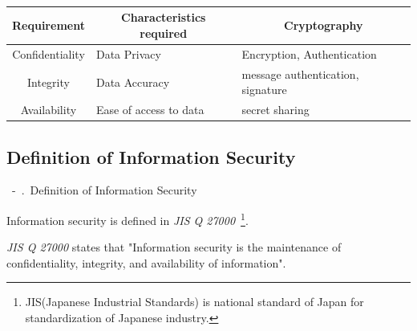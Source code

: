 \documentclass{beamer}
\newcommand{\shownum}{\thesection\ -\ \thesubsection.\ }
\begin{document}
\begin{frame}
    \frametitle{\threeelementsofinformationsecutiry}
    \begin{table}
        \centering
        \renewcommand{\arraystretch}{1.5}
        \begin{tabular}{cll}
            \hline
            Requirement     & \multicolumn{1}{c}{Characteristics required} & \multicolumn{1}{c}{Cryptography}                  \\
            \hline
            Confidentiality & Data Privacy                                 & Encryption, Authentication                        \\
            Integrity       & Data Accuracy                                & {\footnotesize message authentication, signature} \\
            Availability    & Ease of access to data                       & secret sharing                                    \\
            \hline
        \end{tabular}
    \end{table}
\end{frame}
\subsection{Definition of Information Security}
\begin{frame}{\shownum Definition of Information Security}
    \begin{block}{}
        Information security is defined in {\it JIS Q 27000}\ \footnote{JIS(Japanese Industrial Standards) is national standard of Japan for standardization of Japanese industry.}.
    \end{block}
    \begin{block}{}
        {\it JIS Q 27000} states that {"Information security is the maintenance of confidentiality, integrity, and availability of information"}.
    \end{block}
\end{frame}
\end{document}
